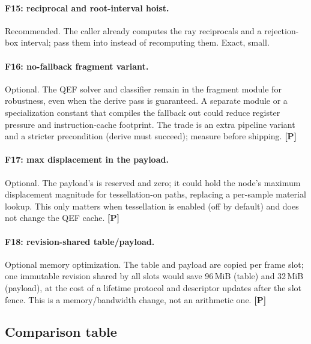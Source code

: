 \documentclass[11pt,a4paper]{article}
\newcommand{\evP}{\textsf{\textbf{\color{evP}[P]}}}
\newcommand{\code}[1]{\texttt{\detokenize{#1}}}
\theoremstyle{plain}
\theoremstyle{definition}
\theoremstyle{remark}
\begin{document}
\paragraph{F15: reciprocal and root-interval hoist.} Recommended. The caller
already computes the ray reciprocals and a rejection-box interval; pass them
into \code{rmMarchRoot} instead of recomputing them. Exact, small.

\paragraph{F16: no-fallback fragment variant.} Optional. The QEF solver and
classifier remain in the fragment module for robustness, even when the derive
pass is guaranteed. A separate module or a specialization constant that
compiles the fallback out could reduce register pressure and instruction-cache
footprint. The trade is an extra pipeline variant and a stricter precondition
(derive must succeed); measure before shipping. \evP

\paragraph{F17: max displacement in the payload.} Optional. The payload's
\code{normal.w} is reserved and zero; it could hold the node's maximum
displacement magnitude for tessellation-on paths, replacing a per-sample
material lookup. This only matters when tessellation is enabled (off by
default) and does not change the QEF cache. \evP

\paragraph{F18: revision-shared table/payload.} Optional memory optimization.
The table and payload are copied per frame slot; one immutable revision shared
by all slots would save 96\,MiB (table) and 32\,MiB (payload), at the cost of a
lifetime protocol and descriptor updates after the slot fence. This is a
memory/bandwidth change, not an arithmetic one. \evP

\subsection{Comparison table}
\end{document}
